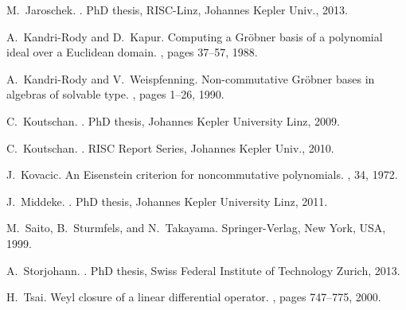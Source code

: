 \documentclass{sig-alternate}
\begin{document}
\begin{thebibliography}{10}
M.~Jaroschek.
.
\newblock PhD thesis, RISC-Linz, Johannes Kepler Univ., 2013.

A.~Kandri-Rody and D.~Kapur.
\newblock Computing a {G}r\"{o}bner basis of a polynomial ideal over a {E}uclidean
  domain.
, pages 37--57, 1988.

A.~Kandri-Rody and V.~Weispfenning.
\newblock Non-commutative {G}r\"obner bases in algebras of solvable type.
, pages 1--26, 1990.

C.~Koutschan.
.
\newblock PhD thesis, Johannes Kepler University Linz, 2009.

C.~Koutschan.
.
\newblock RISC Report Series, Johannes Kepler Univ., 2010.

J.~Kovacic.
\newblock An {E}isenstein criterion for noncommutative polynomials.
, 34, 1972.

J.~Middeke.
.
\newblock PhD thesis, Johannes Kepler University Linz, 2011.

M.~Saito, B.~Sturmfels, and N.~Takayama.
\newblock Springer-Verlag, New York, USA, 1999.

A.~Storjohann.
.
\newblock PhD thesis, Swiss Federal Institute of Technology Zurich, 2013.

H.~Tsai.
\newblock Weyl closure of a linear differential operator.
, pages 747--775, 2000.

\end{thebibliography}
\end{document}
